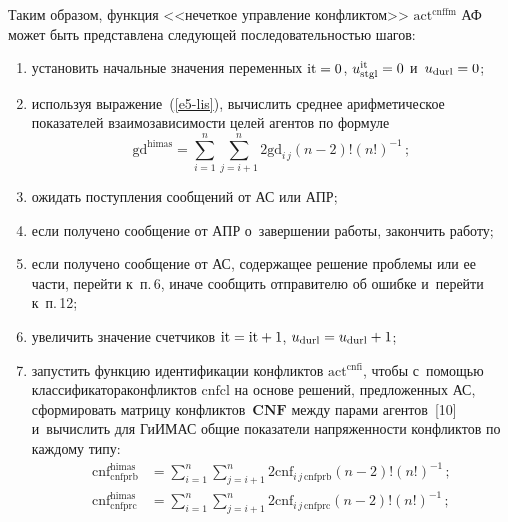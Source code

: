 \begin{multicols}{2}
  Таким образом, функция <<нечеткое управление конфликтом>> 
$\mathrm{act}^{\mathrm{cnffm}}$ АФ может быть представлена следующей 
последовательностью шагов:
  \begin{enumerate}[(1)]
  \item установить начальные значения переменных $\mathrm{it}\hm=0$, $u_{\mathrm{stgl}}^{\mathrm{it}} 
\hm=0$ и~$u_{\mathrm{durl}}\hm=0$;
  \item используя выражение~(\ref{e5-lis}), вычислить среднее арифметическое 
показателей взаимозависимости целей агентов по формуле
  $$
  \mathrm{gd}^{\mathrm{himas}} =\sum\limits^n_{i=1} \sum\limits^n_{j=i+1} 2 \mathrm{gd}_{i\,j} 
(n-2)! (n!)^{-1}\,;
  $$
  \item ожидать поступления сообщений от АС или АПР;
  \item если получено сообщение от АПР о~завершении работы, закончить 
работу;
  \item если получено сообщение от АС, содержащее решение проблемы или ее 
части, перейти к~п.\,6, иначе сообщить отправителю об ошибке и~перейти 
к~п.\,12;
  \item увеличить значение счетчиков $\mathrm{it}\hm= \mathrm{it}\hm+1$, $u_{\mathrm{durl}}\hm= 
u_{\mathrm{durl}}\hm+1$;
  \item запустить функцию идентификации конфликтов $\mathrm{act}^{\mathrm{cnfi}}$, 
чтобы с~помощью классификатора\linebreak конфликтов $\mathrm{cnfcl}$ на основе решений, 
предложенных АС, сформировать мат\-ри\-цу конф\-лик\-тов~$\mathbf{CNF}$ между 
парами агентов~[10] и~вы\-чис\-лить для \mbox{ГиИМАС} общие показатели 
\mbox{напряженности} конф\-лик\-тов по каж\-до\-му типу:
  \begin{align*}
  \mathrm{cnf}_{\mathrm{cnfprb}}^{\mathrm{himas}} &= \sum\limits^n_{i=1} \sum\limits^n_{j=i+1} 
2 \mathrm{cnf}_{i\,j\,\mathrm{cnfprb}} (n-2)! (n!)^{-1}\,;\\
  \mathrm{cnf}^{\mathrm{himas}}_{\mathrm{cnfprc}} &= \sum\limits^n_{i=1} \sum\limits^n_{j=i+1} 
2\mathrm{cnf}_{i\,j\,\mathrm{cnfprc}} (n-2)! (n!)^{-1}\,;
  \end{align*}
    

\end{enumerate}
\end{multicols}
